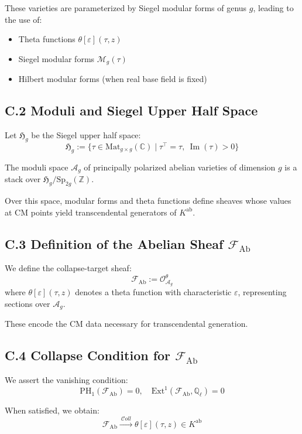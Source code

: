 \documentclass[11pt]{article}
\begin{document}
These varieties are parameterized by Siegel modular forms of genus \( g \), leading to the use of:
\begin{itemize}
    \item Theta functions \( \theta[\varepsilon](\tau, z) \)
    \item Siegel modular forms \( \mathcal{M}_g(\tau) \)
    \item Hilbert modular forms (when real base field is fixed)
\end{itemize}

\subsection*{C.2 Moduli and Siegel Upper Half Space}

Let \( \mathfrak{H}_g \) be the Siegel upper half space:
\[
\mathfrak{H}_g := \{ \tau \in \mathrm{Mat}_{g \times g}(\mathbb{C}) \mid \tau^\top = \tau,\ \operatorname{Im}(\tau) > 0 \}
\]

The moduli space \( \mathcal{A}_g \) of principally polarized abelian varieties of dimension \( g \) is a stack over \( \mathfrak{H}_g / \mathrm{Sp}_{2g}(\mathbb{Z}) \).

Over this space, modular forms and theta functions define sheaves whose values at CM points yield transcendental generators of \( K^{\mathrm{ab}} \).

\subsection*{C.3 Definition of the Abelian Sheaf \( \mathcal{F}_{\mathrm{Ab}} \)}

We define the collapse-target sheaf:
\[
\mathcal{F}_{\mathrm{Ab}} := \mathcal{O}_{\mathcal{A}_g}^{\theta}
\]
where \( \theta[\varepsilon](\tau, z) \) denotes a theta function with characteristic \( \varepsilon \), representing sections over \( \mathcal{A}_g \).

These encode the CM data necessary for transcendental generation.

\subsection*{C.4 Collapse Condition for \( \mathcal{F}_{\mathrm{Ab}} \)}

We assert the vanishing condition:
\[
\mathrm{PH}_1(\mathcal{F}_{\mathrm{Ab}}) = 0, \quad \mathrm{Ext}^1(\mathcal{F}_{\mathrm{Ab}}, \mathbb{Q}_\ell) = 0
\]

When satisfied, we obtain:
\[
\mathcal{F}_{\mathrm{Ab}} \xrightarrow{\ \mathcal{C}oll\ } \theta[\varepsilon](\tau, z) \in K^{\mathrm{ab}}
\]
\end{document}
